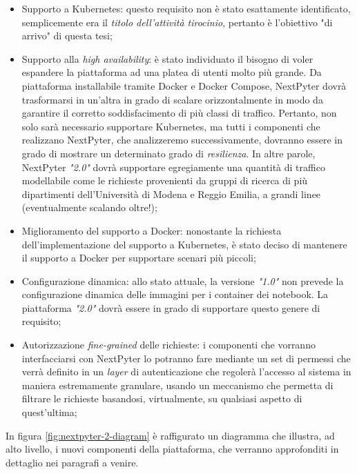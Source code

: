 \begin{itemize}
    \item Supporto a Kubernetes: questo requisito non è stato esattamente identificato, semplicemente era il \textit{titolo dell'attività tirocinio}, pertanto è l'obiettivo "di arrivo" di questa tesi;
    \item Supporto alla \textit{high availability}: è stato individuato il bisogno di voler espandere la piattaforma ad una platea di utenti molto più grande. Da piattaforma installabile tramite Docker e Docker Compose, NextPyter dovrà trasformarsi in un'altra in grado di scalare orizzontalmente in modo da garantire il corretto soddisfacimento di più classi di traffico. Pertanto, non solo sarà necessario supportare Kubernetes, ma tutti i componenti che realizzano NextPyter, che analizzeremo successivamente, dovranno essere in grado di mostrare un determinato grado di \textit{resilienza}. In altre parole, NextPyter \textit{"2.0"} dovrà supportare egregiamente una quantità di traffico modellabile come le richieste provenienti da gruppi di ricerca di più dipartimenti dell'Università di Modena e Reggio Emilia, a grandi linee (eventualmente scalando oltre!);
    \item Miglioramento del supporto a Docker: nonostante la richiesta dell'implementazione del supporto a Kubernetes, è stato deciso di mantenere il supporto a Docker per supportare scenari più piccoli;
    \item Configurazione dinamica: allo stato attuale, la versione \textit{"1.0"} non prevede la configurazione dinamica delle immagini per i container dei notebook. La piattaforma \textit{"2.0"} dovrà essere in grado di supportare questo genere di requisito;
    \item Autorizzazione \textit{fine-grained} delle richieste: i componenti che vorranno interfacciarsi con NextPyter lo potranno fare mediante un set di permessi che verrà definito in un \textit{layer} di autenticazione che regolerà l'accesso al sistema in maniera estremamente granulare, usando un meccanismo che permetta di filtrare le richieste basandosi, virtualmente, su qualsiasi aspetto di quest'ultima;
\end{itemize}
\newline
In figura \ref{fig:nextpyter-2-diagram} è raffigurato un diagramma che illustra, ad alto livello, i nuovi componenti della piattaforma, che verranno approfonditi in dettaglio nei paragrafi a venire.
\newline
